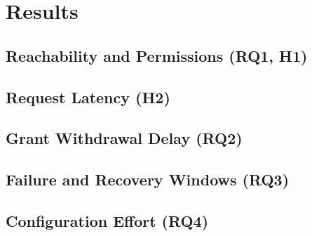 \chapter{Results}\label{ch:results}
\section{Reachability and Permissions (RQ1, H1)}
\section{Request Latency (H2)}
\section{Grant Withdrawal Delay (RQ2)}
\section{Failure and Recovery Windows (RQ3)}
\section{Configuration Effort (RQ4)}

